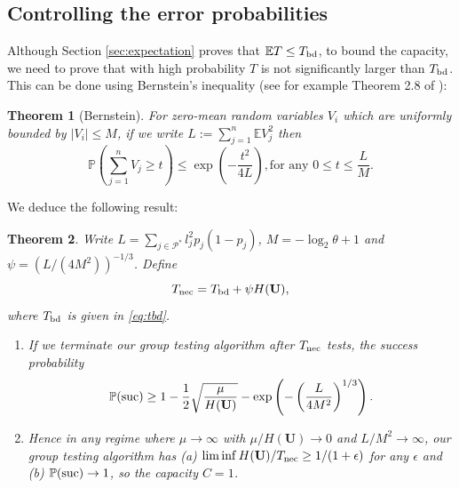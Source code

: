 \documentclass[conference]{IEEEtran}
\newtheorem{theorem}{Theorem}[section]
\newcommand{\vc}[1]{{\mathbf{ #1}}}
\newcommand{\ep}{{\mathbb{E}}}
\newcommand{\pr}{{\mathbb{P}}}
\newcommand{\suc}{{\rm suc}}
\newcommand{\setP}{{\mathcal{P}}}
\newcommand{\nec}{{\rm nec}}
\newcommand{\bd}{{\rm bd}}
\begin{document}
\subsection{Controlling the error probabilities} \label{sec:main}
%
Although Section \ref{sec:expectation} proves that $\ep T \leq T_{\bd}$,
 to bound the capacity, we need to prove that with high probability
$T$ is not significantly larger than $T_{\bd}$. This can be done using
 Bernstein's inequality (see for example Theorem 2.8 of \cite{petrov}):
%
\begin{theorem}[Bernstein] \label{thm:bernstein}
For zero-mean random variables $V_i$ which are uniformly bounded by $|V_i| \leq M$,
if we write $L  := \sum_{j=1}^n \ep V_j^2 $
 then
\begin{equation} \pr \left( \sum_{j=1}^n V_j \geq t \right)  \leq  \exp \left( - \frac{ t^2}{4 L}  \right),  \mbox{
for any $0 \leq t \leq \frac{L}{M}$.}   \label{eq:bernstein}
\end{equation}
\end{theorem}
%
We deduce the following result:
%
\begin{theorem} \label{thm:main}
Write  $L = \sum_{j \in \setP^*} l_j^2 p_j (1-p_j)$,  $M = -\log_2 \theta+1$
and $\psi = (L/(4M^2))^{-1/3}$.
Define
\begin{equation} \label{eq:tnec}
 T_{\nec} = T_{\bd} + \psi H(\vc{U}), \end{equation}
where $T_{\bd} $ is given in \eqref{eq:tbd}.
\begin{enumerate}
\item \label{it:part1} If we terminate our group testing algorithm after
$T_{\nec}$ tests, the success probability
\begin{equation} \label{eq:errorprob} 
\pr(\suc) \geq 1 - \frac{1}{2} \sqrt{ \frac{\mu}{H(\vc{U}) }} -  \exp \left( - \left( \frac{L}{4  M^2 }  \right)^{1/3}
\right).
\end{equation}
\item \label{it:part2}
Hence  in any regime where $\mu \rightarrow \infty$ with
 $\mu/H(\vc{U}) \rightarrow 0$ and $L/M^2 \rightarrow \infty$,  
our group testing algorithm has  (a) $ \liminf H(\vc{U})/T_{\nec} \geq 1/(1+ \epsilon)$ for any $\epsilon$ and (b)
$\pr(\suc) \rightarrow 1$, so the capacity $C = 1$.
\end{enumerate}
\end{theorem}
\end{document}
